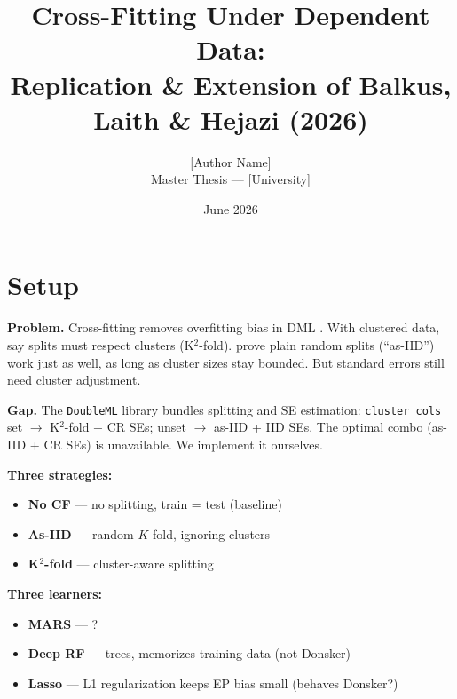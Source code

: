 \documentclass[11pt,a4paper]{article}
\title{\textbf{Cross-Fitting Under Dependent Data:}\\[4pt]
\large Replication \& Extension of Balkus, Laith \& Hejazi (2026)}
\author{[Author Name]\\Master Thesis --- [University]}
\date{June 2026}
\begin{document}
\maketitle

\section{Setup}

\textbf{Problem.} Cross-fitting removes overfitting bias in DML \citep{chernozhukov2018}. With clustered data, \citet{chiang2021} say splits must respect clusters (K$^2$-fold). \citet{balkus2026} prove plain random splits (``as-IID'') work just as well, as long as cluster sizes stay bounded. But standard errors still need cluster adjustment.

\textbf{Gap.} The \texttt{DoubleML} library bundles splitting and SE estimation: \texttt{cluster\_cols} set $\to$ K$^2$-fold + CR SEs; unset $\to$ as-IID + IID SEs. The optimal combo (as-IID + CR SEs) is unavailable. We implement it ourselves.

\textbf{Three strategies:}
\begin{itemize}[leftmargin=1.5em, nosep]
  \item \textbf{No CF} --- no splitting, train = test (baseline)
  \item \textbf{As-IID} --- random $K$-fold, ignoring clusters
  \item \textbf{K$^2$-fold} --- cluster-aware splitting \citep{chiang2021}
\end{itemize}

\textbf{Three learners:}
\begin{itemize}[leftmargin=1.5em, nosep]
  \item \textbf{MARS} --- ?
  \item \textbf{Deep RF} --- trees, memorizes training data (not Donsker)
  \item \textbf{Lasso} --- L1 regularization keeps EP bias small (behaves Donsker?)
\end{itemize}
\end{document}
